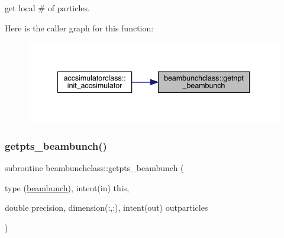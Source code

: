 get local \# of particles. 

Here is the caller graph for this function\+:\nopagebreak
\begin{figure}[H]
\begin{center}
\leavevmode
\includegraphics[width=341pt]{namespacebeambunchclass_aec332b229b76111b68db82b20ab2846e_icgraph}
\end{center}
\end{figure}
\mbox{\label{namespacebeambunchclass_abc601844eaf85727173ebd3ef6d2b256}} 
\subsubsection{\texorpdfstring{getpts\_beambunch()}{getpts\_beambunch()}}
{\footnotesize\ttfamily subroutine beambunchclass\+::getpts\+\_\+beambunch (\begin{DoxyParamCaption}\item[{type (\mbox{\hyperlink{namespacebeambunchclass_structbeambunchclass_1_1beambunch}{beambunch}}), intent(in)}]{this,  }\item[{double precision, dimension(\+:,\+:), intent(out)}]{outparticles }\end{DoxyParamCaption})}

\mbox{\label{namespacebeambunchclass_abf23fdc1e8ca69fe7fe8f2995fbc1bcc}} 
